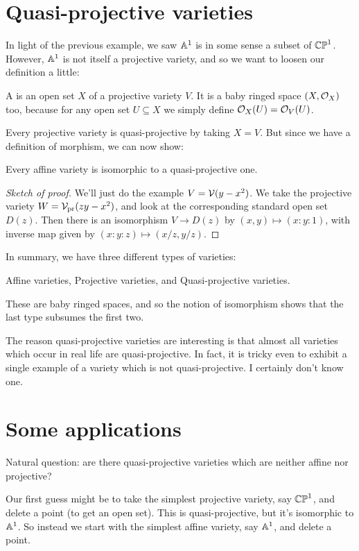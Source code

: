 \section{Quasi-projective varieties}
In light of the previous example, we saw $\mathbb A^1$ is in some
sense a subset of $\mathbb{CP}^1$.
However, $\mathbb A^1$ is not itself a projective variety,
and so we want to loosen our definition a little:
\begin{definition}
	A  is
	an open set $X$ of a projective variety $V$.
	It is a baby ringed space $(X, \mathcal O_X)$ too,
	because for any open set $U \subseteq X$
	we simply define $\mathcal O_X(U) = \mathcal O_V(U)$.
\end{definition}
Every projective variety is quasi-projective by taking $X = V$.
But since we have a definition of morphism, we can now show:
\begin{proposition}
	Every affine variety is isomorphic to a quasi-projective one.
\end{proposition}
\begin{proof}
	[Sketch of proof]
	We'll just do the example $V = \mathcal V(y-x^2)$.
	We take the projective variety $W = \mathcal V_{\text{pr}}(zy-x^2)$,
	and look at the corresponding standard open set $D(z)$.
	Then there is an isomorphism $V \to D(z)$ by $(x,y) \mapsto (x:y:1)$,
	with inverse map given by $(x:y:z) \mapsto (x/z, y/z)$.
\end{proof}

In summary, we have three different types of varieties:
\begin{itemize}
	\ii Affine varieties,
	\ii Projective varieties, and
	\ii Quasi-projective varieties.
\end{itemize}
These are baby ringed spaces, and so the notion of isomorphism
shows that the last type subsumes the first two.

The reason quasi-projective varieties are interesting is that
almost all varieties which occur in real life are quasi-projective.
In fact, it is tricky even to exhibit a single example
of a variety which is not quasi-projective.
I certainly don't know one.

\section{Some applications}
Natural question: are there quasi-projective varieties
which are neither affine nor projective?

Our first guess might be to take the simplest projective variety,
say $\mathbb{CP}^1$, and delete a point (to get an open set).
This is quasi-projective, but it's isomorphic to $\mathbb A^1$.
So instead we start with the simplest affine variety,
say $\mathbb A^1$, and delete a point.


